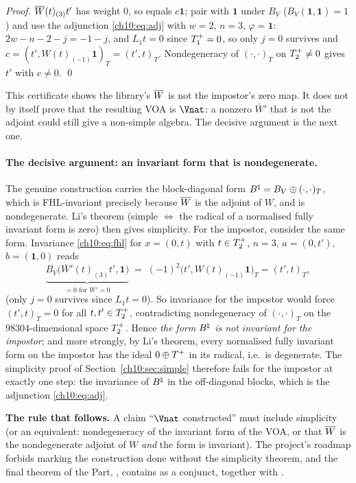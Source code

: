 \emph{Proof.}  $\overline{W}(t)_{(3)}t'$ has weight $0$, so equals $c\mathbf1$; pair with $\mathbf1$ under
$B_V$ ($B_V(\mathbf 1,\mathbf 1)=1$) and use the adjunction \eqref{ch10:eq:adj} with $w=2$, $n=3$,
$\varphi=\mathbf 1$: $2w-n-2-j=-1-j$, and $L_1t=0$ since $T^{+}_1=0$, so only $j=0$ survives and
$c=(t',W(t)_{(-1)}\mathbf1)_T=(t',t)_T$.  Nondegeneracy of $(\cdot,\cdot)_T$ on $T^{+}_2\ne0$ gives
$t'$ with $c\ne0$. \qed

This certificate shows the library's $\overline{W}$ is not the impostor's zero map.  It does not
by itself prove that the resulting VOA is $\Vnat$: a nonzero $\overline W'$ that is not the adjoint
could still give a non-simple algebra.  The decisive argument is the next one.

\paragraph{The decisive argument: an invariant form that is nondegenerate.}
The genuine construction carries the block-diagonal form $B^{\natural}=B_V\oplus(\cdot,\cdot)_T$, which
is FHL-invariant precisely because $\overline{W}$ is the adjoint of $W$, and is nondegenerate.  Li's
theorem (simple $\iff$ the radical of a normalised fully invariant form is zero) then gives
simplicity.  For the impostor, consider the same form.  Invariance \eqref{ch10:eq:fhl} for
$x=(0,t)$ with $t\in T^{+}_2$, $n=3$, $a=(0,t')$, $b=(\mathbf 1,0)$ reads
\begin{equation*}
 \underbrace{B_V\bigl(\overline W'(t)_{(3)}t',\mathbf 1\bigr)}_{=0\text{ for }\overline W'=0}
 \;=\;(-1)^2\bigl(t',W(t)_{(-1)}\mathbf1\bigr)_T=(t',t)_T ,
\end{equation*}
(only $j=0$ survives since $L_1t=0$).  So invariance for the impostor would force $(t',t)_T=0$ for
all $t,t'\in T^{+}_2$, contradicting nondegeneracy of $(\cdot,\cdot)_T$ on the $98304$-dimensional
space $T^{+}_2$.  Hence \emph{the form $B^{\natural}$ is not invariant for the impostor}; and more
strongly, by Li's theorem, every normalised fully invariant form on the impostor has the ideal
$0\oplus T^{+}$ in its radical, i.e.\ is degenerate.  The simplicity proof of
Section~\ref{ch10:sec:simple} therefore fails for the impostor at exactly one step: the
invariance of $B^{\natural}$ in the off-diagonal blocks, which is the adjunction \eqref{ch10:eq:adj}.

\begin{warning}
\textbf{The rule that follows.}
A claim ``$\Vnat$ constructed'' must include simplicity (or an equivalent: nondegeneracy of the
invariant form of the VOA, or that $\overline{W}$ is the nondegenerate adjoint of $W$ \emph{and} the
form is invariant).  The project's roadmap forbids marking the construction done without the
simplicity theorem, and the final theorem of the Part, , contains
 as a conjunct, together with .
\end{warning}

